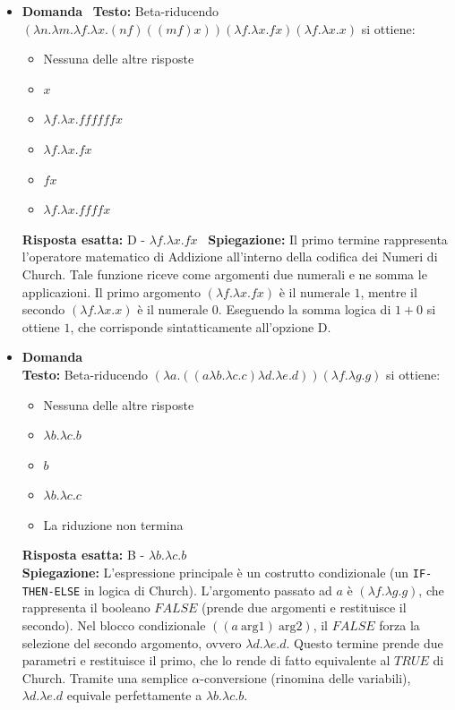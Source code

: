 \documentclass[12pt, a4paper]{article}
\newcounter{domandateoria}
\begin{document}
\begin{itemize}
\item {}\textbf{Domanda \thedomandateoria} \
\textbf{Testo:} Beta-riducendo $(\lambda n.\lambda m.\lambda f.\lambda x.(n f)((m f)x))(\lambda f.\lambda x.f x)(\lambda f.\lambda x.x)$ si ottiene:
\begin{itemize}
\item[A)] Nessuna delle altre risposte
\item[B)] $x$
\item[C)] $\lambda f.\lambda x.f f f f f f x$
\item[D)] $\lambda f.\lambda x.f x$
\item[E)] $f x$
\item[F)] $\lambda f.\lambda x.f f f f x$
\end{itemize}
\textbf{Risposta esatta:} D - $\lambda f.\lambda x.f x$ \
\textbf{Spiegazione:} Il primo termine rappresenta l'operatore matematico di Addizione all'interno della codifica dei Numeri di Church. Tale funzione riceve come argomenti due numerali e ne somma le applicazioni. Il primo argomento $(\lambda f.\lambda x.f x)$ è il numerale $1$, mentre il secondo $(\lambda f.\lambda x.x)$ è il numerale $0$. Eseguendo la somma logica di $1 + 0$ si ottiene $1$, che corrisponde sintatticamente all'opzione D.
\vspace{0.3cm}

\item {}\textbf{Domanda \thedomandateoria} \\
\textbf{Testo:} Beta-riducendo $(\lambda a.((a\lambda b.\lambda c.c)\lambda d.\lambda e.d))(\lambda f.\lambda g.g)$ si ottiene:
\begin{itemize}
    \item[A)] Nessuna delle altre risposte
    \item[B)] $\lambda b.\lambda c.b$
    \item[C)] $b$
    \item[D)] $\lambda b.\lambda c.c$
    \item[E)] La riduzione non termina
\end{itemize}
\textbf{Risposta esatta:} B - $\lambda b.\lambda c.b$ \\
\textbf{Spiegazione:} L'espressione principale è un costrutto condizionale (un \texttt{IF-THEN-ELSE} in logica di Church). L'argomento passato ad $a$ è $(\lambda f.\lambda g.g)$, che rappresenta il booleano $FALSE$ (prende due argomenti e restituisce il secondo). Nel blocco condizionale $((a\ \text{arg1})\ \text{arg2})$, il $FALSE$ forza la selezione del secondo argomento, ovvero $\lambda d.\lambda e.d$. Questo termine prende due parametri e restituisce il primo, che lo rende di fatto equivalente al $TRUE$ di Church. Tramite una semplice $\alpha$-conversione (rinomina delle variabili), $\lambda d.\lambda e.d$ equivale perfettamente a $\lambda b.\lambda c.b$.
\vspace{0.3cm}


\end{itemize}
\end{document}
